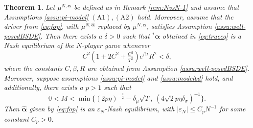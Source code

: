 \documentclass[10pt,a4paper]{article}
\newcommand{\vep}{{\varepsilon}}
\newcommand{\Balpha}{\boldsymbol{\alpha}}
\newcommand{\hBalpha}{\hat{\Balpha}}
\theoremstyle{plain}
\newtheorem{Theorem}{Theorem}[section]
\theoremstyle{definition}
\numberwithin{equation}{section}
\newcommand{\lps}[2]{{}^{#1}\!#2}
\begin{document}
\begin{Theorem}
\label{Thm4.8}
Let $\mu^{N,\Balpha}$ be defined as in Remark \ref{rem:NvsN-1} and assume that Assumptions \ref{assu:pi-model} $\mathrm{(A1),(A2)}$ hold. Moreover, assume that the driver from \eqref{eq:fop}, with $\mu^{N,\hBalpha}$ replaced by $\mu^{N,\Balpha}$, satisfies Assumption \ref{assu:well-posedBSDE}. Then there exists a $\delta>0$ such that
$\lps{*}\Balpha$ obtained in \eqref{eq:trueeq} is a Nash equilibrium of the $N$-player game whenever
\begin{equation}
\label{equ:trueeqcond}
C^{2}(1+2C^{2}+\tfrac{C^{2}}{T^{2}})e^{\beta T}R^{2} < \delta,
\end{equation}
where the constants $C,\beta,R$ are obtained from Assumption \ref{assu:well-posedBSDE}. Moreover, 
suppose assumptions \ref{assu:pi-model} and \eqref{assu:modelbd} hold, and additionally, there exists a $p>1$ such that 
\begin{equation}
\label{equ:condM}
0<M < \min \Big\{(2p\eta)^{-\tfrac{1}{2}} - \delta_{\mu}\sqrt{T}  , \ (4\sqrt{2}p\eta\bar{\delta}_{\sigma})^{-1} \Big\}.
\end{equation}
Then
$\hBalpha$ given by \eqref{eq:fop} is an $\vep_N$-Nash equilibrium, with $|\vep_N| \leq C_{p}N^{-1}$ for some constant $C_{p}>0$.
\end{Theorem}

\end{document}

